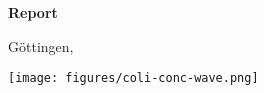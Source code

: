 \documentclass[12pt,        %
  english,ngerman,          %
  paper=a4,                 %
  captions=tablesignature,  %
  listof=numbered,          %
  bibliography=totoc,       %
  headings=small,           %
  headinclude=false,        %
  footinclude=false,        %
  parskip=half-,            %
  oneside,                  %
  DIV=12                    %
  ]{scrbook}                %
\begin{document}
\begin{titlepage}
\begin{center}
{	\Large
	\bfseries
	\textcolor{vzgblue}{
	Report \colireportlang \colireportno
	}
      
      \vspace{1.25cm}
      
      \huge
      \mdseries
        \colititle
    }

    \vfill

    {
      \normalsize

      \vfill
      \vfill
      
      Göttingen, \colidate
    }
      
      \vfill
      
    {
    \texttt{[image: figures/coli-conc-wave.png]}
    }
  \end{center}
\end{titlepage}


\clearpage
\setcounter{tocdepth}{1}

\tableofcontents

\mainmatter






\backmatter

  \cleardoublepage
  \listoffigures
\end{document}
